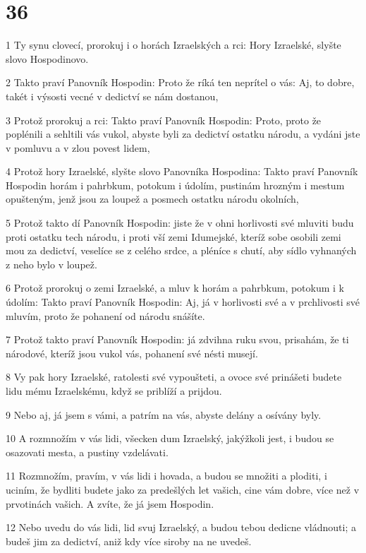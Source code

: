 \chapter{36}

\par 1 Ty synu clovecí, prorokuj i o horách Izraelských a rci: Hory Izraelské, slyšte slovo Hospodinovo.
\par 2 Takto praví Panovník Hospodin: Proto že ríká ten neprítel o vás: Aj, to dobre, takét i výsosti vecné v dedictví se nám dostanou,
\par 3 Protož prorokuj a rci: Takto praví Panovník Hospodin: Proto, proto že poplénili a sehltili vás vukol, abyste byli za dedictví ostatku národu, a vydáni jste v pomluvu a v zlou povest lidem,
\par 4 Protož hory Izraelské, slyšte slovo Panovníka Hospodina: Takto praví Panovník Hospodin horám i pahrbkum, potokum i údolím, pustinám hrozným i mestum opušteným, jenž jsou za loupež a posmech ostatku národu okolních,
\par 5 Protož takto dí Panovník Hospodin: jiste že v ohni horlivosti své mluviti budu proti ostatku tech národu, i proti vší zemi Idumejské, kteríž sobe osobili zemi mou za dedictví, veselíce se z celého srdce, a pléníce s chutí, aby sídlo vyhnaných z neho bylo v loupež.
\par 6 Protož prorokuj o zemi Izraelské, a mluv k horám a pahrbkum, potokum i k údolím: Takto praví Panovník Hospodin: Aj, já v horlivosti své a v prchlivosti své mluvím, proto že pohanení od národu snášíte.
\par 7 Protož takto praví Panovník Hospodin: já zdvihna ruku svou, prisahám, že ti národové, kteríž jsou vukol vás, pohanení své nésti musejí.
\par 8 Vy pak hory Izraelské, ratolesti své vypoušteti, a ovoce své prinášeti budete lidu mému Izraelskému, když se priblíží a prijdou.
\par 9 Nebo aj, já jsem s vámi, a patrím na vás, abyste delány a osívány byly.
\par 10 A rozmnožím v vás lidi, všecken dum Izraelský, jakýžkoli jest, i budou se osazovati mesta, a pustiny vzdelávati.
\par 11 Rozmnožím, pravím, v vás lidi i hovada, a budou se množiti a ploditi, i uciním, že bydliti budete jako za predešlých let vašich, cine vám dobre, více než v prvotinách vašich. A zvíte, že já jsem Hospodin.
\par 12 Nebo uvedu do vás lidi, lid svuj Izraelský, a budou tebou dedicne vládnouti; a budeš jim za dedictví, aniž kdy více siroby na ne uvedeš.
